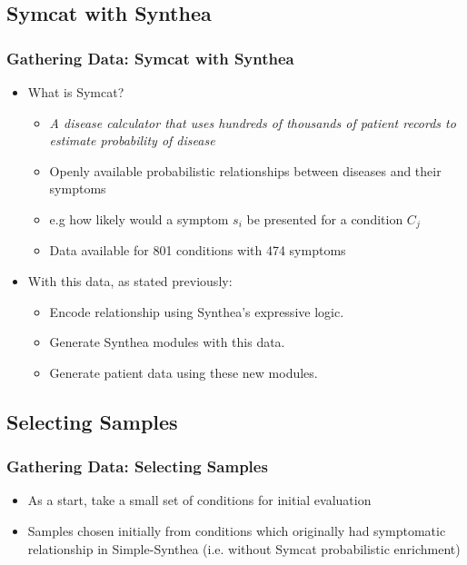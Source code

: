 \documentclass{beamer}
\begin{document}
\subsection{Symcat with Synthea}
\begin{frame}
\frametitle{Gathering Data: Symcat with Synthea}
\begin{itemize}
	\item What is Symcat?
		\begin{itemize}
			\item \textit{A disease calculator that uses hundreds of thousands of patient records to estimate probability of disease}
			\item Openly available probabilistic relationships between diseases and their symptoms
			\item e.g how likely would a symptom $s_i$ be presented for a condition $C_j$
			\item Data available for 801 conditions with 474 symptoms
		\end{itemize}
	\item With this data, as stated previously:
		\begin{itemize}
			\item Encode relationship using Synthea's expressive logic.
			\item Generate Synthea modules with this data.
			\item Generate patient data using these new modules.
		\end{itemize}
\end{itemize}
\end{frame}

\subsection{Selecting  Samples}
	\begin{frame}
	\frametitle{Gathering Data: Selecting  Samples}
	\begin{itemize}
		\item As a start, take a small set of conditions for initial evaluation
		\item Samples chosen initially from conditions which originally had symptomatic relationship in Simple-Synthea (i.e. without Symcat probabilistic enrichment) 
	\end{itemize}
	\end{frame}
\end{document}

